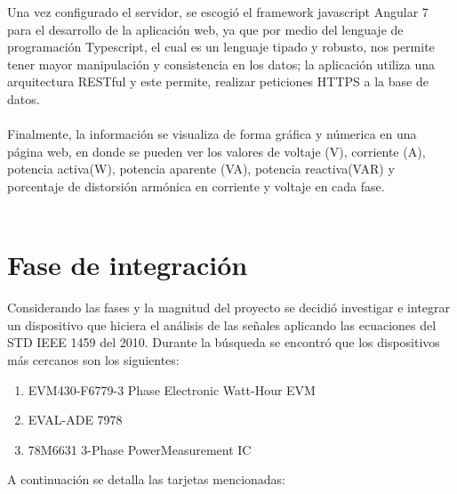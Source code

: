 Una vez configurado el servidor, se escogió el framework javascript Angular 7 para el desarrollo de la aplicación web, ya que por medio del lenguaje de programación Typescript, el cual es un lenguaje tipado y robusto, nos permite tener mayor manipulación y consistencia en los datos; la aplicación utiliza una arquitectura RESTful y este permite, realizar peticiones HTTPS a la base de datos.\\\\
Finalmente, la información se visualiza de forma gráfica y númerica en una página web, en donde se pueden ver los valores de voltaje (V), corriente (A), potencia activa(W), potencia aparente (VA), potencia reactiva(VAR) y porcentaje de distorsión armónica en corriente y voltaje en cada fase.\\\\


\section{Fase de integración}
    Considerando las fases y la magnitud del proyecto se decidió investigar e integrar un dispositivo que hiciera el análisis de las señales aplicando las ecuaciones del STD IEEE 1459 del 2010. Durante la búsqueda se encontró que los dispositivos más cercanos son los siguientes:\\
    \begin{enumerate}
        \itemsep0em
        \item EVM430-F6779-3 Phase Electronic Watt-Hour EVM
        \item EVAL-ADE 7978
        \item 78M6631 3-Phase PowerMeasurement IC
    \end{enumerate}

    A continuación se detalla las tarjetas mencionadas:\\
